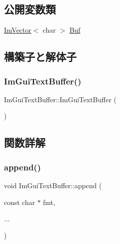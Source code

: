 \subsection*{公開変数類}
\begin{DoxyCompactItemize}
\item 
\mbox{\hyperlink{class_im_vector}{Im\+Vector}}$<$ char $>$ \mbox{\hyperlink{struct_im_gui_text_buffer_aa6de034b1920cdae5505cc58abf14240}{Buf}}
\end{DoxyCompactItemize}


\subsection{構築子と解体子}
\mbox{\label{struct_im_gui_text_buffer_a4c4369c5e65f591554428b947c498d0d}} 
\subsubsection{\texorpdfstring{Im\+Gui\+Text\+Buffer()}{ImGuiTextBuffer()}}
{\footnotesize\ttfamily Im\+Gui\+Text\+Buffer\+::\+Im\+Gui\+Text\+Buffer (\begin{DoxyParamCaption}{ }\end{DoxyParamCaption})\hspace{0.3cm}{\ttfamily [inline]}}



\subsection{関数詳解}
\mbox{\label{struct_im_gui_text_buffer_a791ac3e5638c58b53772e14bee1323db}} 
\subsubsection{\texorpdfstring{append()}{append()}}
{\footnotesize\ttfamily void Im\+Gui\+Text\+Buffer\+::append (\begin{DoxyParamCaption}\item[{const char $\ast$}]{fmt,  }\item[{}]{... }\end{DoxyParamCaption})}

